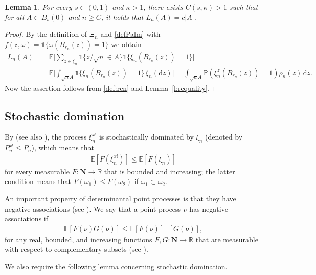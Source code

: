 \documentclass{amsart}
\theoremstyle{plain}
\newtheorem{lemma}[theorem]{Lemma}
\theoremstyle{definition}
\theoremstyle{remark}
\def\E{\mathbb E}
\def\P{\mathbb P}
\def\one{\mathds1}
\def\d{\mathrm d}
\begin{document}
\begin{lemma}\label{l:int}
For every $s \in (0,1)$ and $\kappa >1$, there exists $C(s, \kappa)>1$ such that for all $A \subset B_{s}(0)$ and $n \ge C$,  it holds that $L_n(A)=c|A|$.
\end{lemma}
\begin{proof}
	By the definition of $\Xi_n$ and \eqref{defPalm} with $f(z, \omega) = \one\{\omega(B_{r_n}(z ))=1\}$ we obtain
	\begin{align*}
	L_n(A) &= 	\E \Big[\sum_{z \in \xi_n} \one\{z/\sqrt n \in A\} \one \{\xi_n(B_{r_n}(z ))=1\}\Big]\\
	&= \E \Big[\int_{\sqrt n A}  \one \{\xi_n(B_{r_n}(z ))=1\} \, \xi_n(\d z)\Big]= \int_{\sqrt nA} \P(\xi_n^z(B_{r_n}(z))=1) \rho_n(z) \, \d z.
	\end{align*}
	Now the assertion follows from \eqref{def:rcn} and Lemma~\ref{l:requality}. 
\end{proof}

\subsection{Stochastic domination}
By \cite[Theorem 3]{G10} (see also \cite{MR21}), the process $\xi_n^{x!}$ is stochastically dominated by $\xi_n$ (denoted by $P_n^{x!}\le P_n$), which means that
\begin{align}
	\mathbb{E} [F(\xi_n^{x!})] \le \mathbb{E} [F(\xi_n)] \label{Palmdom}
\end{align}
for every measurable $F\colon \mathbf{N} \to \mathbb{R}$ that is bounded and increasing; the latter condition means that $F(\omega_1) \le F(\omega_2)$ if $\omega_1 \subset \omega_2$.


An important property of determinantal point processes is that they have negative associations (see \cite[Theorem 3.7]{L14}). We say that a point process $\nu$ {has negative associations} if 
\begin{align}
{	\mathbb E[F(\nu)G(\nu)] \le  \mathbb E[F(\nu)] \E[G(\nu)],} \label{defNA}
\end{align}
for any  real, bounded, and increasing functions $F,G\colon \mathbf N \to \mathbb R$ that are measurable with respect to complementary subsets (see \cite{LS19}).

We also require the following lemma concerning stochastic domination.
\end{document}
